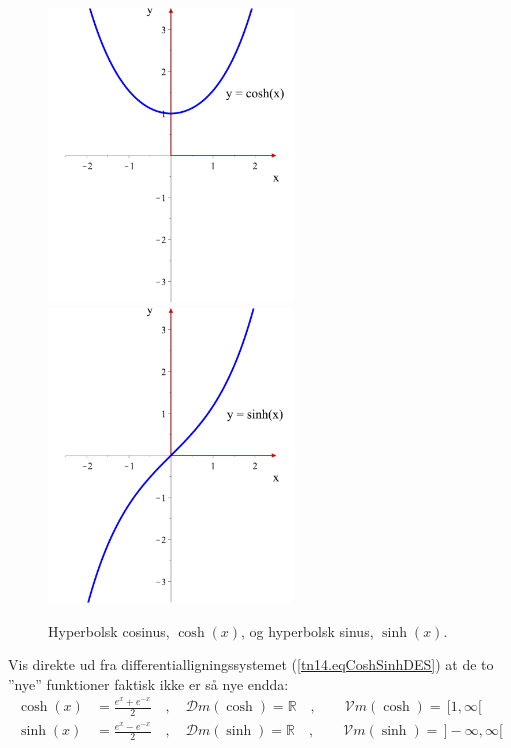 \begin{figure}[h]
\centerline{\includegraphics[width=65mm]{FIGS/plotcosh.pdf} \qquad \includegraphics[width=65mm]{FIGS/plotsinh.pdf}}
\begin{center}
\caption{Hyperbolsk cosinus, $\cosh(x)$, og hyperbolsk sinus, $\sinh(x)$.} \label{tn14.figplotCoshSinh}
\end{center}
\end{figure}


\begin{exercise} \label{tn14.exercExplicCoshSinh}
Vis direkte ud fra differentialligningssystemet (\ref{tn14.eqCoshSinhDES}) at de to ''nye'' funktioner faktisk ikke er så nye endda:
\begin{equation}
\begin{aligned}
\cosh(x) &= \frac{e^x + e^{-x}}{2}\quad , \quad \mathcal{D}m(\cosh) = \mathbb{R}\quad , \quad \quad \mathcal{V}m(\cosh) = \,  [1, \infty[ \\
\sinh(x) &= \frac{e^x - e^{-x}}{2}\quad , \quad \mathcal{D}m(\sinh) = \mathbb{R}\quad , \quad \quad \mathcal{V}m(\sinh) = \, ]-\infty, \infty[
\end{aligned}
\end{equation}
\end{exercise}

